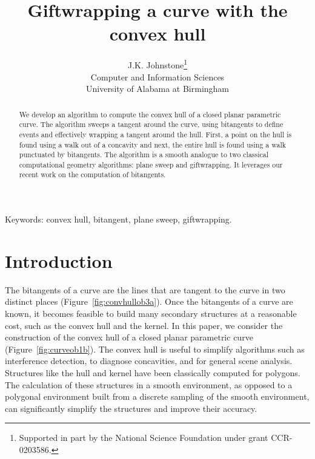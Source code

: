 \documentclass[11pt]{article}
\title{Giftwrapping a curve with the convex hull}
\author{J.K. Johnstone\thanks{Supported in part by the National Science Foundation
	under grant CCR-0203586.}\\
	Computer and Information Sciences\\
	University of Alabama at Birmingham}
\begin{document}
\maketitle

\begin{abstract}
We develop an algorithm to compute the convex hull of a closed planar parametric curve.
The algorithm sweeps a tangent around the curve, using bitangents
to define events and effectively wrapping a tangent around the hull.
First, a point on the hull is found using a walk out of a concavity and next,
the entire hull is found using a walk punctuated by bitangents.
The algorithm is a smooth analogue to two classical computational geometry algorithms:
plane sweep and giftwrapping.
It leverages our recent work on the computation of bitangents.
\end{abstract}

Keywords: convex hull, bitangent, plane sweep, giftwrapping.


\section{Introduction}

The bitangents of a curve are the lines that are tangent to the curve in two distinct places
(Figure~\ref{fig:convhullob3a}).
Once the bitangents of a curve are known, 
it becomes feasible to build many secondary structures at a reasonable cost,
such as the convex hull and the kernel.
In this paper, we consider the construction of the convex hull of a closed planar parametric curve
(Figure~\ref{fig:curveob1b}).
The convex hull is useful to simplify algorithms such as interference detection,
to diagnose concavities, and for general scene analysis.
Structures like the hull and kernel have been classically computed for polygons.
The calculation of these structures in a smooth environment,
as opposed to a polygonal environment built from a discrete sampling of the
smooth environment, can significantly simplify the structures and improve their accuracy.
\end{document}
